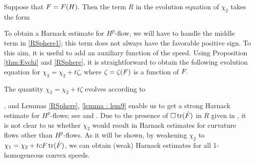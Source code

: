 \documentclass{amsart}
\begin{document}
\begin{lemma}\label{RSphere}
Suppose that $F=F(H).$ Then the term $R$ in the evolution equation of $\chi_2$ takes the form
\end{lemma}
To obtain a Harnack estimate for $H^{p}$-flow, we will have to handle the middle term in \eqref{RSphere1}; this term does not always have the favorable positive sign. To this aim, it is useful to add an auxiliary function of the speed. Using Proposition \ref{thm:Evchi} and \cref{RSphere}, it is straightforward to obtain the following evolution equation for $\chi_3=\chi_2+t\zeta$, where $\zeta=\zeta(F)$ is a function of $F.$
\begin{lemma}\label{lemma : lem9}
The quantity
$\chi_3=\chi_2+t\zeta$
evolves according to
\end{lemma}
, and Lemmas \ref{RSphere}, \ref{lemma : lem9} enable us to get a strong Harnack estimate for $H^{p}$-flows; see  and . Due to the presence of $\Box\operatorname{tr}(\dot{F})$ in $R$ given in , it is not clear to us whether $\chi_2$ would result in Harnack estimates for curvature flows other than $H^{p}$-flows. As it will be shown, by weakening $\chi_2$ to $\chi_1=\chi_2+tcF\operatorname{tr}(\dot{F})$,  we can obtain (weak) Harnack estimates for all 1-homogeneous convex speeds.
\end{document}
